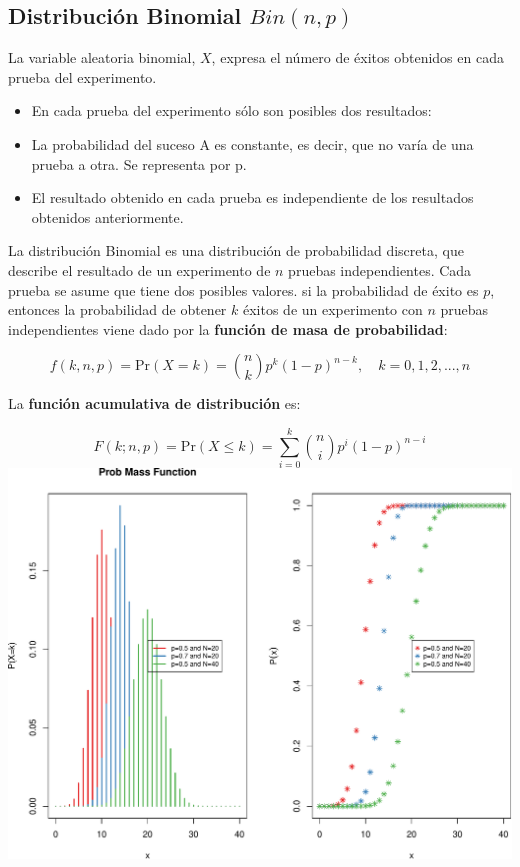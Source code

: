 \documentclass[]{article}
\numberwithin{equation}{section}
\begin{document}
\subsection{\texorpdfstring{Distribución Binomial
\(Bin(n,p)\)}{Distribución Binomial Bin(n,p)}}\label{distribucion-binomial-binnp}

La variable aleatoria binomial, \(X\), expresa el número de éxitos
obtenidos en cada prueba del experimento.

\begin{itemize}
\item
  En cada prueba del experimento sólo son posibles dos resultados:
\item
  La probabilidad del suceso A es constante, es decir, que no varía de
  una prueba a otra. Se representa por p.
\item
  El resultado obtenido en cada prueba es independiente de los
  resultados obtenidos anteriormente.
\end{itemize}

La distribución Binomial es una distribución de probabilidad discreta,
que describe el resultado de un experimento de \(n\) pruebas
independientes. Cada prueba se asume que tiene dos posibles valores. si
la probabilidad de éxito es \(p\), entonces la probabilidad de obtener
\(k\) éxitos de un experimento con \(n\) pruebas independientes viene
dado por la \textbf{función de masa de probabilidad}:

\[
f(k,n,p) = \mbox{Pr}(X=k)=\binom{n}{k} p^k (1-p)^{n-k}, \quad k=0,1,2,...,n
\]

La \textbf{función acumulativa de distribución} es:

\[
F(k;n,p) = \mbox{Pr}(X\leq k) = \sum_{i=0}^{k}\binom{n}{i} p^i (1-p)^{n-i}
\] \includegraphics{tema4_files/figure-latex/unnamed-chunk-1-1.pdf}
\end{document}
